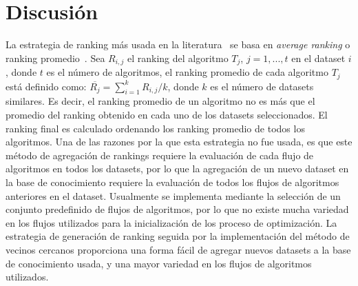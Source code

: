 
\section{Discusión}\label{sec:discusion}

%
%
%	
%	
%	

La estrategia de ranking más usada en la literatura~\cite{fuerer2015efficient, sun2014MetaLearningAT, bradzil2009metalearning} se basa en \textit{average ranking} o ranking promedio~\cite{bradzil2009metalearning}. Sea $R_{i,j}$ el ranking del algoritmo $T_{j}$, $j=1,...,t$ en el dataset $i$, donde $t$ es el número de algoritmos, el ranking promedio de cada algoritmo $T_{j}$ está definido como: $\overline{R_{j}} = \sum^{k}_{i=1}R_{i,j} / k$, donde $k$ es el número de datasets similares. Es decir, el ranking promedio de un algoritmo no es más que el promedio del ranking obtenido en cada uno de los datasets seleccionados. El ranking final es calculado ordenando los ranking promedio de todos los algoritmos. Una de las razones por la que esta estrategia no fue usada, es que este método de agregación de rankings requiere la evaluación de cada flujo de algoritmos en todos los datasets, por lo que la agregación de un nuevo dataset en la base de conocimiento requiere la evaluación de todos los flujos de algoritmos anteriores en el dataset. Usualmente se implementa mediante la selección de un conjunto predefinido de flujos de algoritmos, por lo que no existe mucha variedad en los flujos utilizados para la inicialización de los proceso de optimización. La estrategia de generación de ranking seguida por la implementación del método de vecinos cercanos proporciona una forma fácil de agregar nuevos datasets a la base de conocimiento usada, y una mayor variedad en los flujos de algoritmos utilizados.

